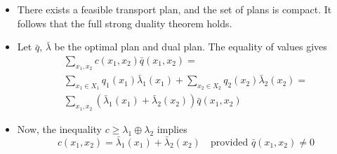 \documentclass[xcolor=svgnames]{beamer}
\begin{document}
\begin{frame}
\begin{itemize}
    \item There exists a feasible transport plan, and the set of plans is compact. It follows that the full strong duality theorem holds.
    \item Let $\bar q$, $\bar \lambda$ be the optimal plan and dual plan. The equality of values gives
    \begin{multline*}
    \sum_{x_1,x_2} c(x_1,x_2)\bar q(x_1,x_2) = \\ \sum_{x_1\in X_1}q_1(x_1) \bar \lambda_1(x_1) + \sum_{x_2 \in X_2} q_2(x_2) \bar \lambda_2(x_2) = \\
    \sum_{x_1,x_2} \left(\bar \lambda_1(x_1) + \bar \lambda_2(x_2)\right) \bar q(x_1,x_2) 
    \end{multline*}
    \item Now, the inequality $c \geq \lambda_1 \oplus \lambda _2$ implies
    \begin{equation*}
        c(x_1,x_2)=\bar \lambda_1(x_1) + \bar \lambda_2(x_2) \quad \text{provided $\bar q(x_1,x_2) \neq 0$}
    \end{equation*}
\end{itemize}
    
\end{frame}
\end{document}

